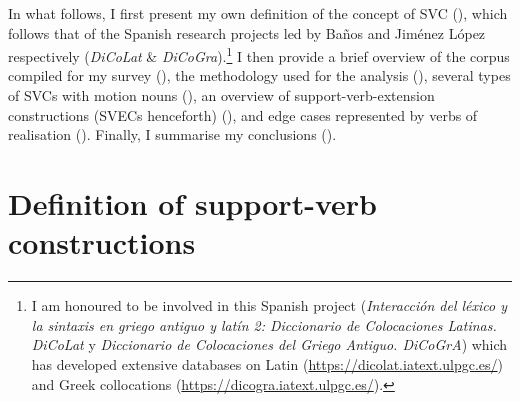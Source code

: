 \documentclass[output=paper,colorlinks,citecolor=brown]{langscibook}
\begin{document}
\z

\z

In what follows, I first present my own definition of the concept of SVC (),
which follows that of the Spanish research projects led by Baños and Jiménez López
respectively (\emph{DiCoLat} \& \emph{DiCoGra}).\footnote{I am honoured to be involved in
  this Spanish project (\emph{Interacción del léxico y la sintaxis en griego antiguo y
    latín 2: Diccionario de Colocaciones Latinas. DiCoLat} y \emph{Diccionario de
    Colocaciones del Griego Antiguo. DiCoGrA}) which has developed extensive databases on
  Latin (\url{https://dicolat.iatext.ulpgc.es/}) and Greek collocations
  (\url{https://dicogra.iatext.ulpgc.es/}).} I then provide a brief overview of the corpus
compiled for my survey (), the methodology used for the analysis
(), several types of SVCs with motion nouns (), an overview of
support-verb-extension constructions (SVECs henceforth) (), and edge cases
represented by verbs of realisation (). Finally, I summarise my
conclusions ().

\section{Definition of support-verb constructions}\label{sec:vc:2}
\end{document}
